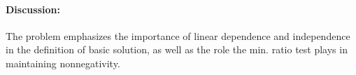 \documentclass[10pt]{article}
\begin{document}
\begin{enumerate}
  \medskip

  \paragraph{Discussion:} The problem emphasizes the importance of
    linear dependence and independence in the definition of basic
    solution, as well as the role the min. ratio test plays in
    maintaining nonnegativity. 
\end{enumerate}
  
\end{document}
